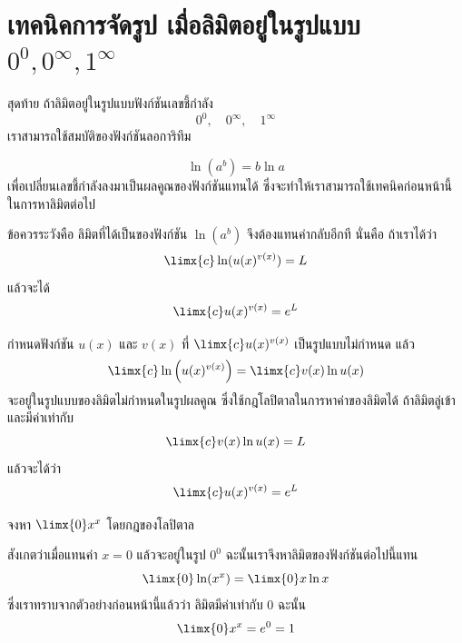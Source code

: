 \section[ยกกำลัง]{เทคนิคการจัดรูป เมื่อลิมิตอยู่ในรูปแบบ $0^0, 0^{\infty}, 1^{\infty}$}
\frame{\sectionpage}

\begin{frame}[t]
สุดท้าย ถ้าลิมิตอยู่ในรูปแบบฟังก์ชันเลขชี้กำลัง
\[0^0, \quad 0^{\infty}, \quad 1^{\infty}\]
เราสามารถใช้สมบัติของฟังก์ชันลอการิทึม
\begin{slide}
\[ \ln (a^b) = b \ln a \]
เพื่อเปลี่ยนเลขชี้กำลังลงมาเป็นผลคูณของฟังก์ชันแทนได้ ซึ่งจะทำให้เราสามารถใช้เทคนิคก่อนหน้านี้ในการหาลิมิตต่อไป

ข้อควรระวังคือ ลิมิตที่ได้เป็นของฟังก์ชัน $\ln (a^b)$ จึงต้องแทนค่ากลับอีกที นั่นคือ ถ้าเราได้ว่า
\[ \limx{c} \ln ( u(x)^{v(x)} ) = L\]
แล้วจะได้
\[ \limx{c} u(x)^{v(x)} = e^L\]
\end{slide}
\end{frame}

\begin{frame}
\begin{remark}{}{}
กำหนดฟังก์ชัน $u(x)$ และ $v(x)$ ที่ $\limx{c} u(x)^{v(x)}$ เป็นรูปแบบไม่กำหนด แล้ว
\begin{equation}
\limx{c} \ln \left( u(x)^{v(x)}\right) = \limx{c} v(x) \ln u(x) 
\end{equation}
จะอยู่ในรูปแบบของลิมิตไม่กำหนดในรูปผลคูณ ซึ่งใช้กฎโลปิตาลในการหาค่าของลิมิตได้ ถ้าลิมิตลู่เข้าและมีค่าเท่ากับ
\[ \limx{c} v(x) \ln u(x) = L\]
แล้วจะได้ว่า
\[ \limx{c} u(x)^{v(x)} = e^L\]
\end{remark}
\end{frame}




\begin{frame}[t]
\begin{ex}
จงหา $\limx{0} x^x$ โดยกฎของโลปิตาล
\end{ex}\pa 
\begin{sol}
สังเกตว่าเมื่อแทนค่า $x=0$ แล้วจะอยู่ในรูป $0^0$ ฉะนั้นเราจึงหาลิมิตของฟังก์ชันต่อไปนี้แทน
\[ \limx{0} \ln (x^x) = \limx{0} x \ln x \]
ซึ่งเราทราบจากตัวอย่างก่อนหน้านี้แล้วว่า ลิมิตมีค่าเท่ากับ 0 ฉะนั้น
\[ \limx{0} x^x = e^0 = 1\]
\end{sol}
\end{frame}





